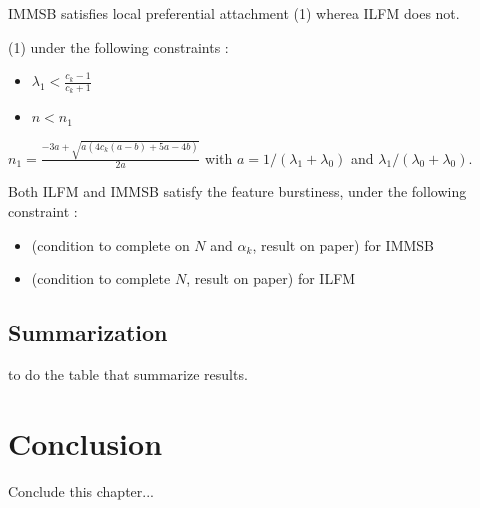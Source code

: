 \begin{proposition}\label{th:ldegree_mg}
    IMMSB satisfies local preferential attachment (1) wherea ILFM does not.

    (1) under the following constraints :

    \begin{itemize}
    \item $ \lambda_1 < \frac{c_k-1}{c_k+1}$
    \item $ n < n_1$
    \end{itemize}
    $n_1 = \frac{-3a + \sqrt{a(4c_k(a-b)+5a-4b)}}{2a}$
    with $a = 1/(\lambda_1+\lambda_0)$ and $\lambda_1 / (\lambda_0+\lambda_0)$.
    
\end{proposition}

\begin{proposition}\label{th:feature_mg}
    Both ILFM and IMMSB satisfy the feature burstiness, under the following constraint :
    \begin{itemize}
        \item (condition to complete on $N$ and $\alpha_k$, result on paper) for IMMSB
        \item (condition to complete $N$, result on paper) for ILFM
    \end{itemize}
\item 
\end{proposition}


\subsection{Summarization}

to do the table that summarize results.




\section{Conclusion}

Conclude  this chapter...
